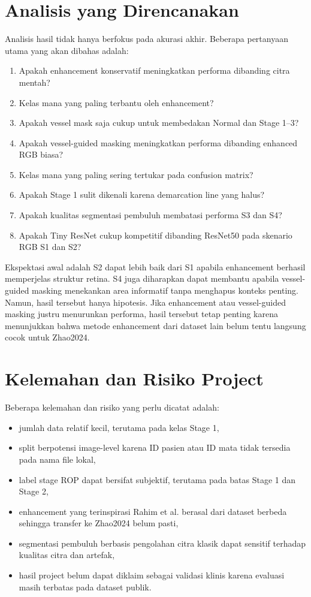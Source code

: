 \documentclass[12pt,a4paper]{article}
\begin{document}
\section*{Analisis yang Direncanakan}

Analisis hasil tidak hanya berfokus pada akurasi akhir. Beberapa pertanyaan utama yang akan dibahas adalah:

\begin{enumerate}
  \item Apakah enhancement konservatif meningkatkan performa dibanding citra mentah?
  \item Kelas mana yang paling terbantu oleh enhancement?
  \item Apakah vessel mask saja cukup untuk membedakan Normal dan Stage 1--3?
  \item Apakah vessel-guided masking meningkatkan performa dibanding enhanced RGB biasa?
  \item Kelas mana yang paling sering tertukar pada confusion matrix?
  \item Apakah Stage 1 sulit dikenali karena demarcation line yang halus?
  \item Apakah kualitas segmentasi pembuluh membatasi performa S3 dan S4?
  \item Apakah Tiny ResNet cukup kompetitif dibanding ResNet50 pada skenario RGB S1 dan S2?
\end{enumerate}

Ekspektasi awal adalah S2 dapat lebih baik dari S1 apabila enhancement berhasil memperjelas struktur retina. S4 juga diharapkan dapat membantu apabila vessel-guided masking menekankan area informatif tanpa menghapus konteks penting. Namun, hasil tersebut hanya hipotesis. Jika enhancement atau vessel-guided masking justru menurunkan performa, hasil tersebut tetap penting karena menunjukkan bahwa metode enhancement dari dataset lain belum tentu langsung cocok untuk Zhao2024.

\section*{Kelemahan dan Risiko Project}

Beberapa kelemahan dan risiko yang perlu dicatat adalah:

\begin{itemize}
  \item jumlah data relatif kecil, terutama pada kelas Stage 1,
  \item split berpotensi image-level karena ID pasien atau ID mata tidak tersedia pada nama file lokal,
  \item label stage ROP dapat bersifat subjektif, terutama pada batas Stage 1 dan Stage 2,
  \item enhancement yang terinspirasi Rahim et al. berasal dari dataset berbeda sehingga transfer ke Zhao2024 belum pasti,
  \item segmentasi pembuluh berbasis pengolahan citra klasik dapat sensitif terhadap kualitas citra dan artefak,
  \item hasil project belum dapat diklaim sebagai validasi klinis karena evaluasi masih terbatas pada dataset publik.
\end{itemize}
\end{document}
